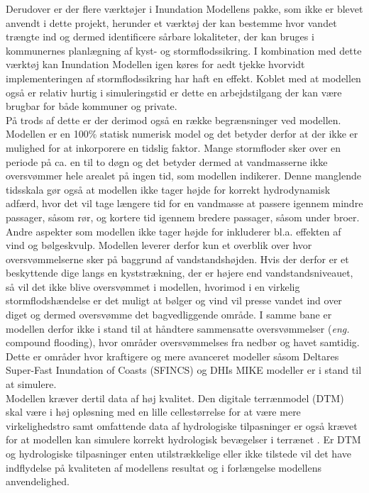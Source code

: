 Derudover er der flere værktøjer i Inundation Modellens pakke, som ikke er blevet anvendt i dette projekt, herunder et værktøj der kan bestemme hvor vandet trængte ind og dermed identificere sårbare lokaliteter, der kan bruges i kommunernes planlægning af kyst- og stormflodssikring. I kombination med dette værktøj kan Inundation Modellen igen køres for aedt tjekke hvorvidt implementeringen af stormflodssikring har haft en effekt. Koblet med at modellen også er relativ hurtig i simuleringstid er dette en arbejdstilgang der kan være brugbar for både kommuner og private.\\


På trods af dette er der derimod også en række begrænsninger ved modellen. Modellen er en 100\% statisk numerisk model og det betyder derfor at der ikke er mulighed for at inkorporere en tidslig faktor. Mange stormfloder sker over en periode på ca. en til to døgn og det betyder dermed at vandmasserne ikke oversvømmer hele arealet på ingen tid, som modellen indikerer. Denne manglende tidsskala gør også at modellen ikke tager højde for korrekt hydrodynamisk adfærd, hvor det vil tage længere tid for en vandmasse at passere igennem mindre passager, såsom rør, og kortere tid igennem bredere passager, såsom under broer.\\

Andre aspekter som modellen ikke tager højde for inkluderer bl.a. effekten af vind og bølgeskvulp. Modellen leverer derfor kun et overblik over hvor oversvømmelserne sker på baggrund af vandstandshøjden. Hvis der derfor er et beskyttende dige langs en kyststrækning, der er højere end vandstandsniveauet, så vil det ikke blive oversvømmet i modellen, hvorimod i en virkelig stormflodshændelse er det muligt at bølger og vind vil presse vandet ind over diget og dermed oversvømme det bagvedliggende område. I samme bane er modellen derfor ikke i stand til at håndtere sammensatte oversvømmelser (\textit{eng.} compound flooding), hvor områder oversvømmelses fra nedbør og havet samtidig. Dette er områder hvor kraftigere og mere avanceret modeller såsom Deltares Super-Fast Inundation of Coasts (SFINCS) og DHIs MIKE modeller er i stand til at simulere.\\

Modellen kræver dertil data af høj kvalitet. Den digitale terrænmodel (DTM) skal være i høj opløsning med en lille cellestørrelse \citep{seenath_effects_2018} for at være mere virkelighedstro samt omfattende data af hydrologiske tilpasninger er også krævet for at modellen kan simulere korrekt hydrologisk bevægelser i terrænet \citep{bales_sources_2009}. Er DTM og hydrologiske tilpasninger enten utilstrækkelige eller ikke tilstede vil det have indflydelse på kvaliteten af modellens resultat og i forlængelse modellens anvendelighed. \\

